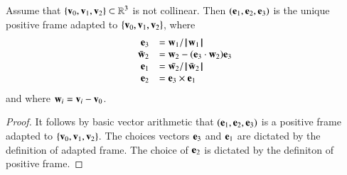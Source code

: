 \begin{lemma}[orthonormalization]\label{lemma:frame}
Assume that $\{\v_0,\v_1,\v_2\}\subset\ring{R}^3$  is not collinear.  Then
$(\e_1,\e_2,\e_3)$ is the  unique positive frame 
adapted to $\{\v_0,\v_1,\v_2\}$, where
\begin{displaymath}
\begin{array}{rll}
   \e_3 &= \w_1/\normo{\w_1}\\
   \bar{\w}_2 &= \w_2 - (\e_3\cdot \w_2) \e_3\\
   \e_1 &= \bar{\w_2}/\normo{\bar{\w}_2}\\
   \e_2 &= \e_3 \times \e_1 \\
\end{array}
\end{displaymath}
and where $\w_i = \v_i - \v_0$.
\end{lemma}

\begin{proof}  It follows by basic vector arithmetic that $(\e_1,\e_2,\e_3)$ is
a positive frame adapted to $\{\v_0,\v_1,\v_2\}$.  The choices vectors $\e_3$ and $\e_1$ are dictated by the definition of adapted frame.  The choice of $\e_2$ is dictated
by the definiton of positive frame.
\end{proof}

